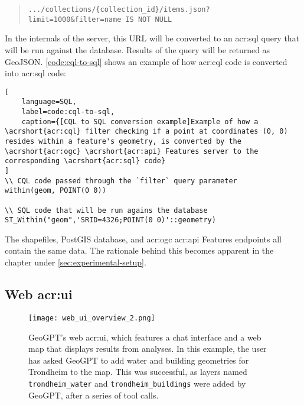 \begin{quote}
    \texttt{.../collections/\{collection\_id\}/items.json?limit=1000\&filter=name IS NOT NULL}
\end{quote}

In the internals of the server, this URL will be converted to an \acrshort{acr:sql} query that will be run against the database. Results of the query will be returned as GeoJSON. \autoref{code:cql-to-sql} shows an example of how \acrshort{acr:cql} code is converted into \acrshort{acr:sql} code:

\begin{lstlisting}[
    language=SQL,
    label=code:cql-to-sql,
    caption={[CQL to SQL conversion example]Example of how a \acrshort{acr:cql} filter checking if a point at coordinates (0, 0) resides within a feature's geometry, is converted by the \acrshort{acr:ogc} \acrshort{acr:api} Features server to the corresponding \acrshort{acr:sql} code} 
]
\\ CQL code passed through the `filter` query parameter
within(geom, POINT(0 0))

\\ SQL code that will be run agains the database
ST_Within("geom",'SRID=4326;POINT(0 0)'::geometry)
\end{lstlisting}

The shapefiles, PostGIS database, and \acrshort{acr:ogc} \acrshort{acr:api} Features endpoints all contain the same data. The rationale behind this becomes apparent in the  chapter under \autoref{sec:experimental-setup}.

\subsection[Web UI]{Web \acrshort{acr:ui}}
\label{subsec:web-ui}

\begin{figure}[h]
    \centering
    \texttt{[image: web\_ui\_overview\_2.png]}
    \caption[GeoGPT's web UI]{GeoGPT's web \acrshort{acr:ui}, which features a chat interface and a web map that displays results from analyses. In this example, the user has asked GeoGPT to add water and building geometries for Trondheim to the map. This was successful, as layers named \texttt{trondheim\_water} and \texttt{trondheim\_buildings} were added by GeoGPT, after a series of tool calls.}
    \label{fig:web-ui}
\end{figure}

